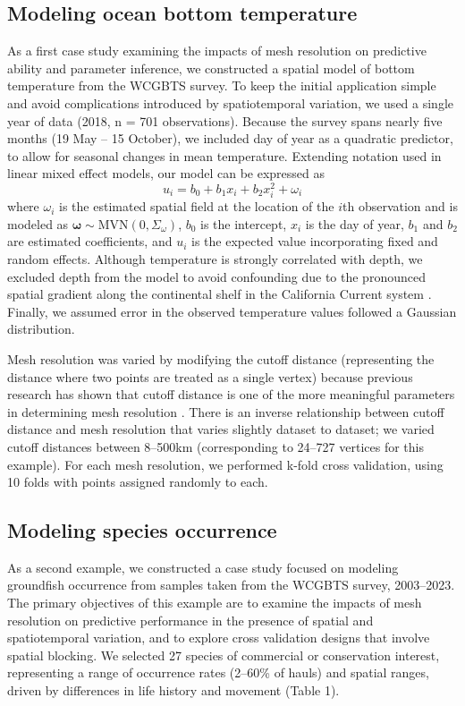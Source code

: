 \documentclass[11pt]{article}
\begin{document}
\subsection{Modeling ocean bottom temperature}

As a first case study examining the impacts of mesh resolution on
predictive ability and parameter inference, we constructed a spatial
model of bottom temperature from the WCGBTS survey. To keep the initial
application simple and avoid complications introduced by spatiotemporal
variation, we used a single year of data (2018, n = 701 observations).
Because the survey spans nearly five months (19 May -- 15 October), we
included day of year as a quadratic predictor, to allow for seasonal
changes in mean temperature. Extending notation used in linear mixed
effect models, our model can be expressed as 
\[
u_{i} = b_{0}+b_{1}x_{i}+ b_{2}x_{i}^{2}+\omega_{i}
\]
where \(\omega_{i}\) is the estimated spatial field at the location
of the \(i\)th observation and is modeled as
\(\mathbf{\omega} \sim \textrm{MVN}(0,\Sigma_\omega)\), \(b_0\) is the
intercept, \(x_{i}\) is the day of year, \(b_1\) and \(b_2\) are
estimated coefficients, and \(u_{i}\) is the expected value
incorporating fixed and random effects. Although temperature is strongly
correlated with depth, we excluded depth from the model to avoid
confounding due to the pronounced spatial gradient along the continental
shelf in the California Current system \citep{keller_northwest_2017}.
Finally, we assumed error in the observed temperature values followed a
Gaussian distribution.

Mesh resolution was varied by modifying the cutoff distance
(representing the distance where two points are treated as a single
vertex) because previous research has shown that cutoff distance is one
of the more meaningful parameters in determining mesh resolution
\citep{righetto_choice_2020}. There is an inverse relationship
between cutoff distance and mesh resolution that varies slightly dataset
to dataset; we varied cutoff distances between 8--500km (corresponding
to 24--727 vertices for this example). For each mesh resolution, we
performed k-fold cross validation, using 10 folds with points assigned
randomly to each.

\subsection{Modeling species occurrence}

As a second example, we constructed a case study focused on modeling groundfish
occurrence from samples taken from the WCGBTS survey, 2003--2023. The primary
objectives of this example are to examine the impacts of mesh resolution on
predictive performance in the presence of spatial and spatiotemporal variation,
and to explore cross validation designs that involve spatial blocking. We
selected 27 species of commercial or conservation interest, representing a
range of occurrence rates (2--60\% of hauls) and spatial ranges, driven by
differences in life history and movement (Table 1).
\end{document}

